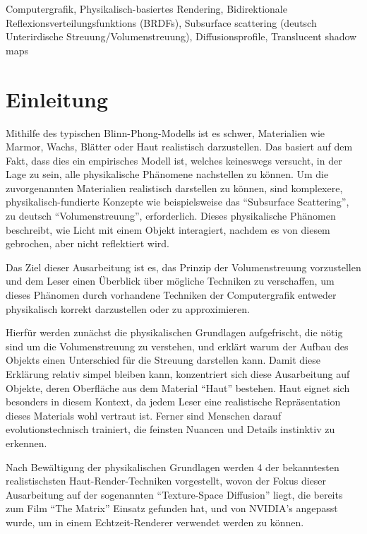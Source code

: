 \documentclass[ngerman,runningheads,a4paper]{llncs}[2018/03/10]
\begin{document}
\begin{keywords}
  Computergrafik, Physikalisch-basiertes Rendering, Bidirektionale Reflexionsverteilungsfunktions (BRDFs), Subsurface scattering (deutsch Unterirdische Streuung/Volumenstreuung), Diffusionsprofile, Translucent shadow maps
\end{keywords}

\section{Einleitung}
\label{sec:intro}

Mithilfe des typischen Blinn-Phong-Modells ist es schwer, Materialien wie Marmor, Wachs, Blätter oder Haut realistisch darzustellen. Das basiert auf dem Fakt, dass dies ein empirisches Modell ist, welches keineswegs versucht, in der Lage zu sein, alle physikalische Phänomene nachstellen zu können.
Um die zuvorgenannten Materialien realistisch darstellen zu können, sind komplexere, physikalisch-fundierte Konzepte wie beispielsweise das \enquote{Subsurface Scattering}, zu deutsch \enquote{Volumenstreuung}, erforderlich.
Dieses physikalische Phänomen beschreibt, wie Licht mit einem Objekt interagiert, nachdem es von diesem gebrochen, aber nicht reflektiert wird.

Das Ziel dieser Ausarbeitung ist es, das Prinzip der Volumenstreuung vorzustellen und dem Leser einen Überblick über mögliche Techniken zu verschaffen, um dieses Phänomen durch vorhandene Techniken der Computergrafik entweder physikalisch korrekt darzustellen oder zu approximieren.

Hierfür werden zunächst die physikalischen Grundlagen aufgefrischt, die nötig sind um die Volumenstreuung zu verstehen, und erklärt warum der Aufbau des Objekts einen Unterschied für die Streuung darstellen kann.
Damit diese Erklärung relativ simpel bleiben kann, konzentriert sich diese Ausarbeitung auf Objekte, deren Oberfläche aus dem Material \enquote{Haut} bestehen.
Haut eignet sich besonders in diesem Kontext, da jedem Leser eine realistische Repräsentation dieses Materials wohl vertraut ist. Ferner sind Menschen darauf evolutionstechnisch trainiert, die feinsten Nuancen und Details instinktiv zu erkennen.

Nach Bewältigung der physikalischen Grundlagen werden 4 der bekanntesten realistischsten Haut-Render-Techniken vorgestellt, wovon der Fokus dieser Ausarbeitung auf der sogenannten \enquote{Texture-Space Diffusion} liegt, die bereits zum Film \enquote{The Matrix} Einsatz gefunden hat, und von NVIDIA's \citet{efficient-human-skin-rendering} angepasst wurde, um in einem Echtzeit-Renderer verwendet werden zu können.
\end{document}
